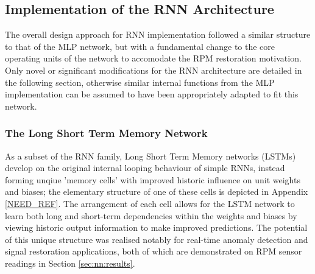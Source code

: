 \documentclass[a4paper, 10pt]{article}
\numberwithin{equation}{section}
\begin{document}
\subsection{Implementation of the RNN Architecture}
The overall design approach for RNN implementation followed a similar structure to that of the MLP network, but with a fundamental change to the core operating units of the network to accomodate the RPM restoration motivation. Only novel or significant modifications for the RNN architecture are detailed in the following section, otherwise similar internal functions from the MLP implementation can be assumed to have been appropriately adapted to fit this network.

\subsubsection{The Long Short Term Memory Network}
As a subset of the RNN family, Long Short Term Memory networks (LSTMs) develop on the original internal looping behaviour of simple RNNs, instead forming unqiue 'memory cells' with improved historic influence on unit weights and biases; the elementary structure of one of these cells is depicted in Appendix \ref{NEED_REF}. The arrangement of each cell allows for the LSTM network to learn both long and short-term dependencies within the weights and biases by viewing historic output information to make improved predictions. The potential of this unique structure was realised notably for real-time anomaly detection and signal restoration applications, both of which are demonstrated on RPM sensor readings in Section \ref{sec:nn:results}.\medbreak
\end{document}
